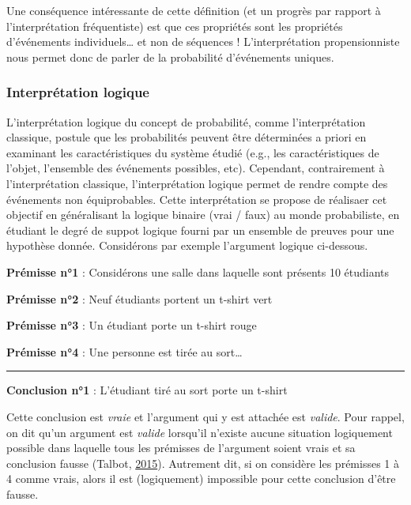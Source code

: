 \documentclass[
  a4paper,11pt,twoside,onecolumn,openright,final,oldfontcommands]{memoir}
\theoremstyle{definition}
\theoremstyle{definition}
\theoremstyle{definition}
\theoremstyle{remark}
\begin{document}
Une conséquence intéressante de cette définition (et un progrès par rapport à l'interprétation fréquentiste) est que ces propriétés sont les propriétés d'événements individuels\ldots{} et non de séquences ! L'interprétation propensionniste nous permet donc de parler de la probabilité d'événements uniques.

\hypertarget{interpruxe9tation-logique}{%
\subsubsection{Interprétation logique}\label{interpruxe9tation-logique}}

L'interprétation logique du concept de probabilité, comme l'interprétation classique, postule que les probabilités peuvent être déterminées a priori en examinant les caractéristiques du système étudié (e.g., les caractéristiques de l'objet, l'ensemble des événements possibles, etc). Cependant, contrairement à l'interprétation classique, l'interprétation logique permet de rendre compte des événements non équiprobables. Cette interprétation se propose de réalisaer cet objectif en généralisant la logique binaire (vrai / faux) au monde probabiliste, en étudiant le degré de suppot logique fourni par un ensemble de preuves pour une hypothèse donnée. Considérons par exemple l'argument logique ci-dessous.

\textbf{Prémisse n°1} : Considérons une salle dans laquelle sont présents 10 étudiants

\textbf{Prémisse n°2} : Neuf étudiants portent un t-shirt vert

\textbf{Prémisse n°3} : Un étudiant porte un t-shirt rouge

\textbf{Prémisse n°4} : Une personne est tirée au sort\ldots{}

\par

\noindent

\rule{\textwidth}{1pt}

\textbf{Conclusion n°1} : L'étudiant tiré au sort porte un t-shirt

Cette conclusion est \emph{vraie} et l'argument qui y est attachée est \emph{valide}. Pour rappel, on dit qu'un argument est \emph{valide} lorsqu'il n'existe aucune situation logiquement possible dans laquelle tous les prémisses de l'argument soient vrais et sa conclusion fausse (Talbot, \protect\hyperlink{ref-talbot_critical_2015}{2015}). Autrement dit, si on considère les prémisses 1 à 4 comme vrais, alors il est (logiquement) impossible pour cette conclusion d'être fausse.
\end{document}
